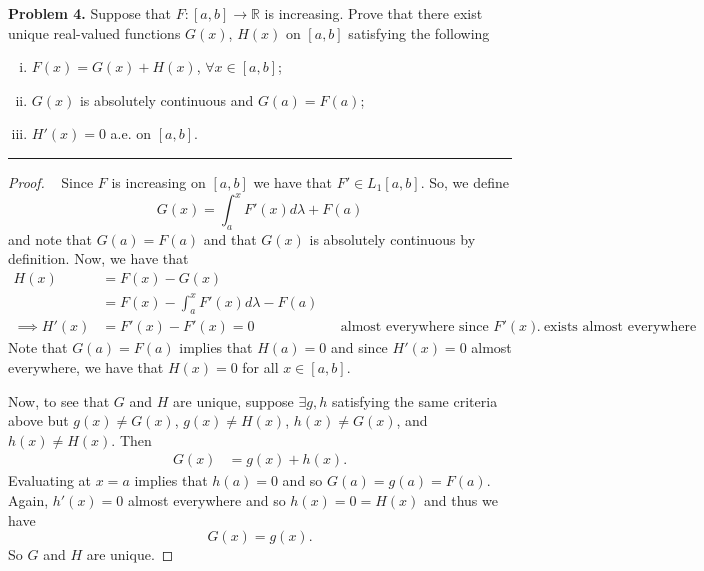 \documentclass[leqno]{article}
\theoremstyle{nonumberplain}
\newtheorem{proof}{Proof}
\newcommand{\R}{\mathbb{R}}
\begin{document}
\pagebreak




\noindent\textbf{Problem 4.} \quad
Suppose that $F\colon [a,b] \to \R$ is increasing. Prove that there exist unique real-valued functions $G(x)$, $H(x)$ on $[a,b]$ satisfying the following
\begin{enumerate}[(i)]
\item $F(x)=G(x)+H(x)$, $\forall x \in [a,b]$;
\item $G(x)$ is absolutely continuous and $G(a)=F(a)$;
\item $H'(x)=0$ a.e. on $[a,b]$.
\end{enumerate}

\noindent\rule[0.5ex]{\linewidth}{1pt}


\begin{proof}~
Since $F$ is increasing on $[a,b]$ we have that $F'\in L_1 [a,b]$.  So, we define
\[
G(x)=\int_a^x F'(x)d\lambda + F(a)
\]
and note that $G(a)=F(a)$ and that $G(x)$ is absolutely continuous by definition.  Now, we have that
\begin{align*}
H(x)&=F(x)-G(x)\\
&= F(x)-\int_a^x F'(x)d\lambda - F(a)\\
\implies H'(x)&=F'(x)-F'(x)=0 &&\textrm{almost everywhere since $F'(x)$ exists almost everywhere}.
\end{align*}
Note that $G(a)=F(a)$ implies that $H(a)=0$ and since $H'(x)=0$ almost everywhere, we have that $H(x)=0$ for all $x\in [a,b]$.

Now, to see that $G$ and $H$ are unique, suppose $\exists g, h$ satisfying the same criteria above but $g(x)\neq G(x)$, $g(x)\neq H(x)$, $h(x)\neq G(x)$, and $h(x)\neq H(x)$.  Then 
\begin{align*}
G(x)&=g(x)+h(x).
\end{align*}
Evaluating at $x=a$ implies that $h(a)=0$ and so $G(a)=g(a)=F(a)$. Again, $h'(x)=0$ almost everywhere and so $h(x)=0=H(x)$ and thus we have 
\[
G(x)=g(x).
\]
So $G$ and $H$ are unique.
\end{proof}

\pagebreak
\end{document}
